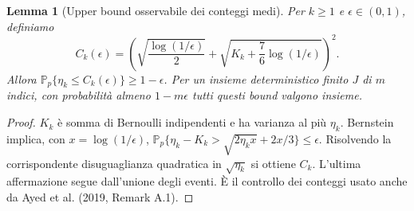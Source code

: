 \documentclass[11pt,a4paper]{article}
\newtheorem{lemma}[proposition]{Lemma}
\theoremstyle{remark}\newtheorem{remark}[proposition]{Osservazione}
\newcommand{\Pp}{\mathbb P_p}
\begin{document}
\begin{lemma}[Upper bound osservabile dei conteggi medi]\label{lem:counts}
Per $k\ge1$ e $\epsilon\in(0,1)$, definiamo
\[
 C_k(\epsilon)=\left(\sqrt{\frac{\log(1/\epsilon)}2}
 +\sqrt{K_k+\frac76\log(1/\epsilon)}\right)^2.
\]
Allora $\Pp\{\eta_k\le C_k(\epsilon)\}\ge1-\epsilon$.
Per un insieme deterministico finito $J$ di $m$ indici,
con probabilità almeno $1-m\epsilon$ tutti questi bound valgono insieme.
\end{lemma}
\begin{proof}
$K_k$ è somma di Bernoulli indipendenti e ha varianza al più $\eta_k$.
Bernstein implica, con $x=\log(1/\epsilon)$,
$\Pp\{\eta_k-K_k>\sqrt{2\eta_kx}+2x/3\}\le\epsilon$.
Risolvendo la corrispondente disuguaglianza quadratica in $\sqrt{\eta_k}$
si ottiene $C_k$. L'ultima affermazione segue dall'unione degli eventi.
È il controllo dei conteggi usato anche da Ayed et al. (2019, Remark A.1).
\end{proof}
\end{document}
